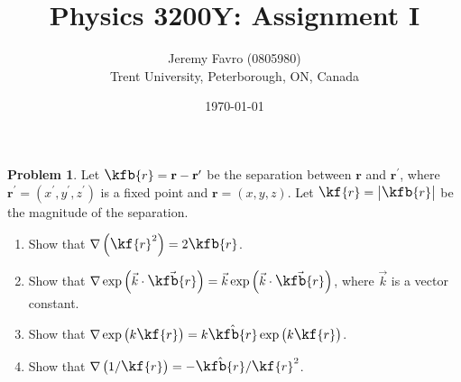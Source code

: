 \documentclass[10pt]{article}
\title{Physics 3200Y: Assignment I}
\author{Jeremy Favro (0805980) \\ Trent University, Peterborough, ON, Canada}
\date{\today}
\theoremstyle{definition}
\newtheorem{problem}{Problem}
\newcommand{\scriptr}{\fontsize{12pt}{12pt}\kf{r}}
\newcommand{\bscriptr}{\fontsize{12pt}{12pt}\kfb{r}}
\newcommand{\bv}[1]{\mathbf{#1}}
\begin{document}
\maketitle

\begin{problem}
Let $\bscriptr=\bv{r}-\bv{r}^\prime$ be the separation between $\bv{r}$ and $\bv{r}^\prime$, where $\bv{r}^\prime = (x^\prime, y^\prime, z^\prime)$ is a fixed point and $\bv{r} = (x, y, z)$. Let
$\scriptr = \left|\bscriptr \right|$ be the magnitude of the separation.
\begin{enumerate}[label=(\alph*)]
  \item Show that $\nabla\left(\scriptr^2\right)=2\bscriptr$.
  \item Show that $\nabla\exp\left(\vec{k}\cdot\vec{\bscriptr}\right)=\vec{k}\exp\left(\vec{k}\cdot\vec{\bscriptr}\right)$, where $\vec{k}$ is a vector constant.
  \item Show that $\nabla\exp\left(k\scriptr\right)=k\hat{\bscriptr}\exp\left(k\scriptr\right)$.
  \item Show that $\nabla \left(1/\scriptr\right)=-\hat{\bscriptr}/\scriptr^2$.
\end{enumerate}
\end{problem}
\end{document}

